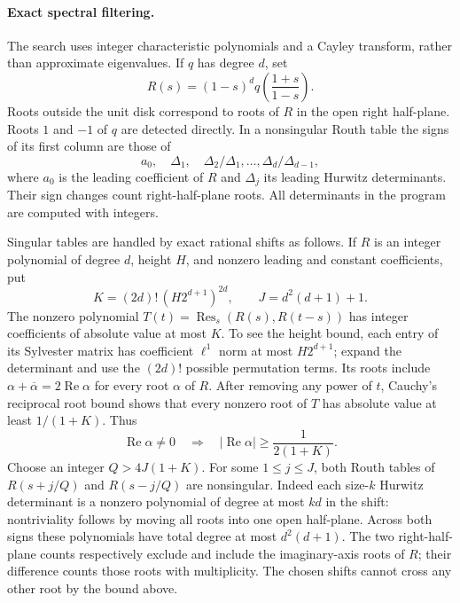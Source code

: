 \documentclass[11pt]{article}
\begin{document}
\paragraph{Exact spectral filtering.}
The search uses integer characteristic polynomials and a Cayley transform,
rather than approximate eigenvalues. If $q$ has degree $d$, set
\[
 R(s)=(1-s)^d q\!\left(\frac{1+s}{1-s}\right).
\]
Roots outside the unit disk correspond to roots of $R$ in the open right
half-plane. Roots $1$ and $-1$ of $q$ are detected directly. In a nonsingular
Routh table the signs of its first column are those of
\[
 a_0,\quad \Delta_1,\quad
 \Delta_2/\Delta_1,\ldots,\Delta_d/\Delta_{d-1},
\]
where $a_0$ is the leading coefficient of $R$ and $\Delta_j$ its leading
Hurwitz determinants. Their sign changes count right-half-plane roots.
All determinants in the program are computed with integers.

Singular tables are handled by exact rational shifts as follows.
If $R$ is an integer polynomial of degree $d$, height $H$, and nonzero
leading and constant coefficients, put
\[
 K=(2d)!\,(H2^{d+1})^{2d},\qquad J=d^2(d+1)+1.
\]
The nonzero polynomial
$T(t)=\operatorname{Res}_s(R(s),R(t-s))$ has integer coefficients of absolute
value at most $K$. To see the height bound, each entry of its Sylvester matrix
has coefficient $\ell^1$ norm at most $H2^{d+1}$; expand the determinant and
use the $(2d)!$ possible permutation terms. Its roots include
$\alpha+\overline\alpha=2\operatorname{Re}\alpha$ for every root $\alpha$ of $R$.
After removing any power of $t$, Cauchy's reciprocal root bound shows that
every nonzero root of $T$ has absolute value at least $1/(1+K)$. Thus
\[
 \operatorname{Re}\alpha\ne0
 \quad\Longrightarrow\quad
 |\operatorname{Re}\alpha|\ge\frac1{2(1+K)}.
\]
Choose an integer $Q>4J(1+K)$. For some $1\le j\le J$, both Routh tables
of $R(s+j/Q)$ and $R(s-j/Q)$ are nonsingular. Indeed each size-$k$ Hurwitz
determinant is a nonzero polynomial of degree at most $kd$ in the shift:
nontriviality follows by moving all roots into one open half-plane.
Across both signs these polynomials have total degree at most $d^2(d+1)$.
The two right-half-plane counts respectively exclude and include the
imaginary-axis roots of $R$; their difference counts those roots with
multiplicity. The chosen shifts cannot cross any other root by the bound above.
\end{document}
